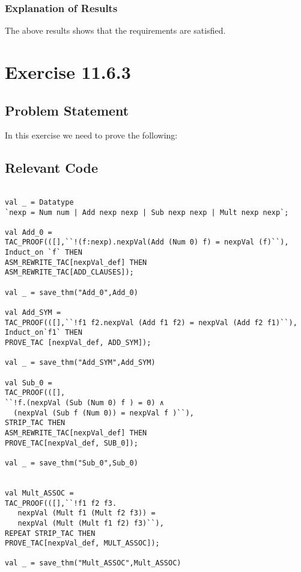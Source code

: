 \documentclass{report}
\begin{document}
\subsection{Explanation of Results}
\label{sec:explanation-results-2}
The above results shows that the requirements are satisfied.



 \chapter{Exercise 11.6.3}
 \label{cha:exercise-11.6.3}
  
 \section{Problem Statement}
 \label{sec:problem-statement-3}

In this exercise we need to prove the following:  

\HOLnexpTheoremsAddXXZero
\HOLnexpTheoremsAddXXSYM
\HOLnexpTheoremsSubXXZero
\HOLnexpTheoremsMultXXASSOC

\section{Relevant Code}
\label{sec:relevant-code-3}
 \lstset{frameround=fftt}
\begin{lstlisting}[frame=tRBL]

val _ = Datatype
`nexp = Num num | Add nexp nexp | Sub nexp nexp | Mult nexp nexp`;

val Add_0 =
TAC_PROOF(([],``!(f:nexp).nexpVal(Add (Num 0) f) = nexpVal (f)``),
Induct_on `f` THEN
ASM_REWRITE_TAC[nexpVal_def] THEN
ASM_REWRITE_TAC[ADD_CLAUSES]);

val _ = save_thm("Add_0",Add_0)

val Add_SYM =
TAC_PROOF(([],``!f1 f2.nexpVal (Add f1 f2) = nexpVal (Add f2 f1)``),
Induct_on`f1` THEN
PROVE_TAC [nexpVal_def, ADD_SYM]);

val _ = save_thm("Add_SYM",Add_SYM)

val Sub_0 =
TAC_PROOF(([],
``!f.(nexpVal (Sub (Num 0) f ) = 0) ∧
  (nexpVal (Sub f (Num 0)) = nexpVal f )``),
STRIP_TAC THEN
ASM_REWRITE_TAC[nexpVal_def] THEN
PROVE_TAC[nexpVal_def, SUB_0]);

val _ = save_thm("Sub_0",Sub_0)


val Mult_ASSOC =
TAC_PROOF(([],``!f1 f2 f3.
   nexpVal (Mult f1 (Mult f2 f3)) =
   nexpVal (Mult (Mult f1 f2) f3)``),
REPEAT STRIP_TAC THEN
PROVE_TAC[nexpVal_def, MULT_ASSOC]);

val _ = save_thm("Mult_ASSOC",Mult_ASSOC)

\end{lstlisting}
\end{document}
